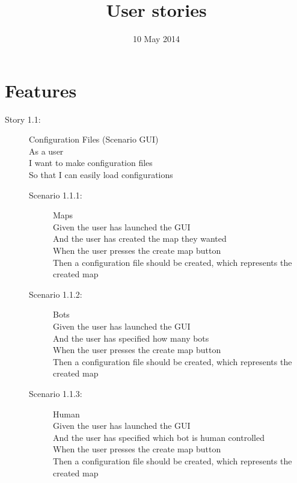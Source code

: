 \documentclass{article}
\title{User stories}
\date{10 May 2014}
\begin{document}
\maketitle
\section{Features}
\begin{description}
	\item[Story 1.1:] Configuration Files (Scenario GUI)\\
	As a user\\
	I want to make configuration files\\
	So that I can easily load configurations

	\begin{description}
		\item[Scenario 1.1.1:] Maps\\
		Given the user has launched the GUI\\
		And the user has created the map they wanted\\
		When the user presses the create map button\\
		Then a configuration file should be created, which represents the created map
		
		\item[Scenario 1.1.2:] Bots\\
		Given the user has launched the GUI\\
		And the user has specified how many bots\\
		When the user presses the create map button\\
		Then a configuration file should be created, which represents the created map

		\item[Scenario 1.1.3:] Human\\
		Given the user has launched the GUI\\
		And the user has specified which bot is human controlled\\
		When the user presses the create map button\\
		Then a configuration file should be created, which represents the created map
	\end{description}
\end{description}
\end{document}
